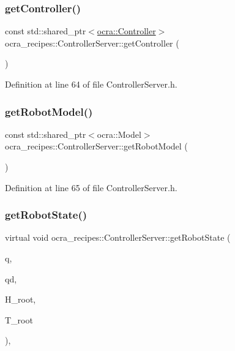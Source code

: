 \subsubsection{\texorpdfstring{get\+Controller()}{getController()}}
{\footnotesize\ttfamily const std\+::shared\+\_\+ptr$<$\hyperlink{classocra_1_1Controller}{ocra\+::\+Controller}$>$ ocra\+\_\+recipes\+::\+Controller\+Server\+::get\+Controller (\begin{DoxyParamCaption}{ }\end{DoxyParamCaption})\hspace{0.3cm}{\ttfamily [inline]}}



Definition at line 64 of file Controller\+Server.\+h.

\hypertarget{classocra__recipes_1_1ControllerServer_ab83e5cc59e33d26cedbea43afae25e1e}{}\label{classocra__recipes_1_1ControllerServer_ab83e5cc59e33d26cedbea43afae25e1e} 
\subsubsection{\texorpdfstring{get\+Robot\+Model()}{getRobotModel()}}
{\footnotesize\ttfamily const std\+::shared\+\_\+ptr$<$ocra\+::\+Model$>$ ocra\+\_\+recipes\+::\+Controller\+Server\+::get\+Robot\+Model (\begin{DoxyParamCaption}{ }\end{DoxyParamCaption})\hspace{0.3cm}{\ttfamily [inline]}}



Definition at line 65 of file Controller\+Server.\+h.

\hypertarget{classocra__recipes_1_1ControllerServer_a93ec150bea9b2a7a03aac1cc048d5484}{}\label{classocra__recipes_1_1ControllerServer_a93ec150bea9b2a7a03aac1cc048d5484} 
\subsubsection{\texorpdfstring{get\+Robot\+State()}{getRobotState()}}
{\footnotesize\ttfamily virtual void ocra\+\_\+recipes\+::\+Controller\+Server\+::get\+Robot\+State (\begin{DoxyParamCaption}\item[{Eigen\+::\+Vector\+Xd \&}]{q,  }\item[{Eigen\+::\+Vector\+Xd \&}]{qd,  }\item[{Eigen\+::\+Displacementd \&}]{H\+\_\+root,  }\item[{Eigen\+::\+Twistd \&}]{T\+\_\+root }\end{DoxyParamCaption})\hspace{0.3cm}{\ttfamily [protected]}, {}}

